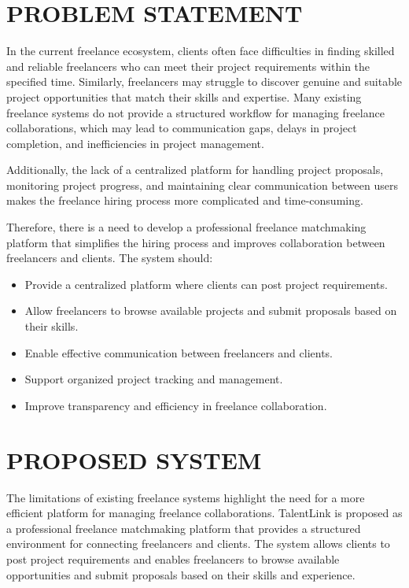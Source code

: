 \documentclass[12pt,a4paper,oneside]{report}
\numberwithin{figure}{chapter}
\numberwithin{table}{chapter}
\begin{document}
\section{PROBLEM STATEMENT}

In the current freelance ecosystem, clients often face difficulties in finding skilled and
reliable freelancers who can meet their project requirements within the specified time.
Similarly, freelancers may struggle to discover genuine and suitable project opportunities
that match their skills and expertise. Many existing freelance systems do not provide a
structured workflow for managing freelance collaborations, which may lead to communication
gaps, delays in project completion, and inefficiencies in project management.

\indent Additionally, the lack of a centralized platform for handling project proposals,
monitoring project progress, and maintaining clear communication between users makes the
freelance hiring process more complicated and time-consuming.

\indent Therefore, there is a need to develop a professional freelance matchmaking
platform that simplifies the hiring process and improves collaboration between freelancers
and clients. The system should:

\begin{itemize}[leftmargin=2em]
  \item Provide a centralized platform where clients can post project requirements.
  \item Allow freelancers to browse available projects and submit proposals based on their
        skills.
  \item Enable effective communication between freelancers and clients.
  \item Support organized project tracking and management.
  \item Improve transparency and efficiency in freelance collaboration.
\end{itemize}

\section{PROPOSED SYSTEM}

The limitations of existing freelance systems highlight the need for a more efficient
platform for managing freelance collaborations. TalentLink is proposed as a professional
freelance matchmaking platform that provides a structured environment for connecting
freelancers and clients. The system allows clients to post project requirements and
enables freelancers to browse available opportunities and submit proposals based on their
skills and experience.
\end{document}
